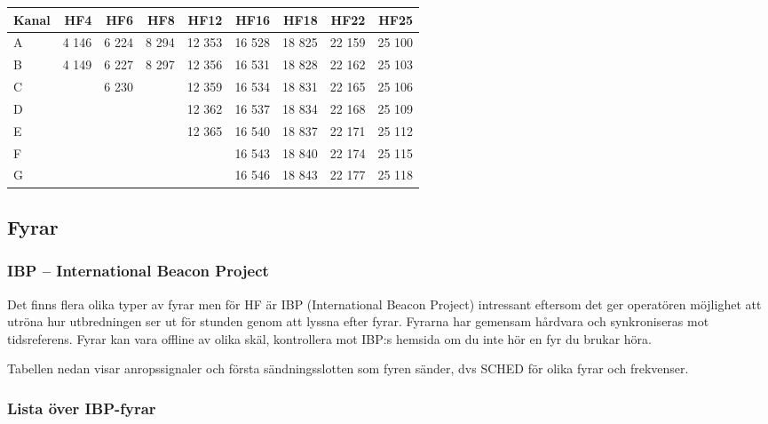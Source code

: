 \begin{longtable}{lrrrrrrrr}
\textbf{Kanal} & \textbf{HF4} & \textbf{HF6} & \textbf{HF8} &
               \textbf{HF12} & \textbf{HF16} & \textbf{HF18} &
               \textbf{HF22} & \textbf{HF25} \\
\hline
\endhead

A & 4 146 & 6 224 & 8 294 & 12 353 & 16 528 & 18 825 & 22 159 & 25 100 \\
B & 4 149 & 6 227 & 8 297 & 12 356 & 16 531 & 18 828 & 22 162 & 25 103 \\
C &       & 6 230 &       & 12 359 & 16 534 & 18 831 & 22 165 & 25 106 \\
D &       &       &       & 12 362 & 16 537 & 18 834 & 22 168 & 25 109 \\
E &       &       &       & 12 365 & 16 540 & 18 837 & 22 171 & 25 112 \\
F &       &       &       &        & 16 543 & 18 840 & 22 174 & 25 115 \\
G &       &       &       &        & 16 546 & 18 843 & 22 177 & 25 118 \\
\end{longtable}

\clearpage

\subsection{Fyrar}

\subsubsection{IBP -- International Beacon Project}

Det finns flera olika typer av fyrar men för HF är IBP (International
Beacon Project) intressant eftersom det ger operatören möjlighet att
utröna hur utbredningen ser ut för stunden genom att lyssna efter
fyrar. Fyrarna har gemensam hårdvara och synkroniseras mot
tidsreferens. Fyrar kan vara offline av olika skäl, kontrollera mot
IBP:s hemsida om du inte hör en fyr du brukar höra.

Tabellen nedan visar anropssignaler och första sändningsslotten som
fyren sänder, dvs SCHED för olika fyrar och frekvenser.

\subsubsection{Lista över IBP-fyrar}

